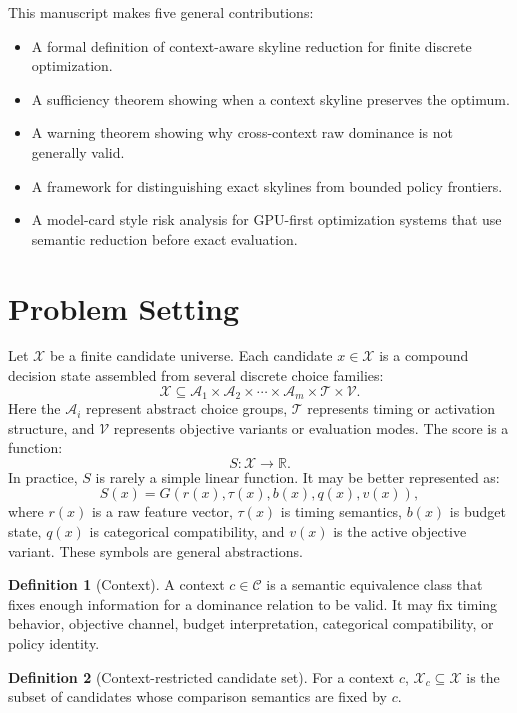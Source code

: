 \documentclass[11pt,oneside]{article}
\theoremstyle{definition}
\newtheorem{definition}{Definition}[section]
\newcommand{\ctx}{\mathcal{C}}
\newcommand{\cand}{\mathcal{X}}
\newcommand{\score}{S}
\newcommand{\R}{\mathbb{R}}
\begin{document}
This manuscript makes five general contributions:
\begin{itemize}
  \item A formal definition of context-aware skyline reduction for finite discrete optimization.
  \item A sufficiency theorem showing when a context skyline preserves the optimum.
  \item A warning theorem showing why cross-context raw dominance is not generally valid.
  \item A framework for distinguishing exact skylines from bounded policy frontiers.
  \item A model-card style risk analysis for GPU-first optimization systems that use semantic reduction before exact evaluation.
\end{itemize}

\section{Problem Setting}

Let \(\cand\) be a finite candidate universe. Each candidate \(x\in\cand\) is a compound decision state assembled from several discrete choice families:
\[
  \cand \subseteq
  \mathcal{A}_1 \times \mathcal{A}_2 \times \cdots \times \mathcal{A}_m
  \times \mathcal{T}
  \times \mathcal{V}.
\]
Here the \(\mathcal{A}_i\) represent abstract choice groups, \(\mathcal{T}\) represents timing or activation structure, and \(\mathcal{V}\) represents objective variants or evaluation modes. The score is a function:
\[
  \score : \cand \rightarrow \R.
\]
In practice, \(\score\) is rarely a simple linear function. It may be better represented as:
\[
  \score(x)
  =
  G\!\left(
    r(x),
    \tau(x),
    b(x),
    q(x),
    v(x)
  \right),
\]
where \(r(x)\) is a raw feature vector, \(\tau(x)\) is timing semantics, \(b(x)\) is budget state, \(q(x)\) is categorical compatibility, and \(v(x)\) is the active objective variant. These symbols are general abstractions.

\begin{definition}[Context]
A context \(c\in\ctx\) is a semantic equivalence class that fixes enough information for a dominance relation to be valid. It may fix timing behavior, objective channel, budget interpretation, categorical compatibility, or policy identity.
\end{definition}

\begin{definition}[Context-restricted candidate set]
For a context \(c\), \(\cand_c\subseteq\cand\) is the subset of candidates whose comparison semantics are fixed by \(c\).
\end{definition}
\end{document}
